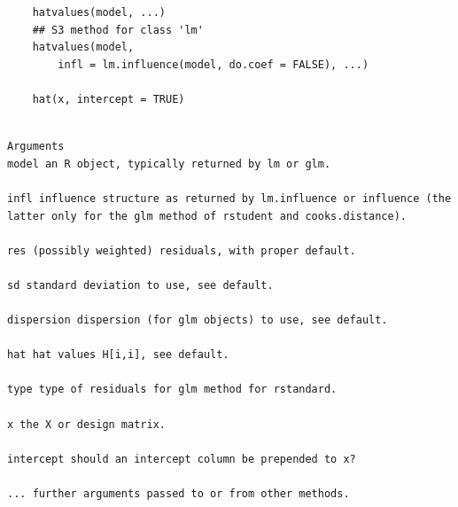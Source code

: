 \documentclass[residuals.tex]{subfiles}
\begin{document}
\begin{framed}
	\begin{verbatim}
	hatvalues(model, ...)
	## S3 method for class 'lm'
	hatvalues(model, 
		infl = lm.influence(model, do.coef = FALSE), ...)
	
	hat(x, intercept = TRUE)
	
	\end{verbatim}
\end{framed}
\newpage
\begin{verbatim}
Arguments
model an R object, typically returned by lm or glm.

infl influence structure as returned by lm.influence or influence (the latter only for the glm method of rstudent and cooks.distance).

res (possibly weighted) residuals, with proper default.

sd standard deviation to use, see default.

dispersion dispersion (for glm objects) to use, see default.

hat hat values H[i,i], see default.

type type of residuals for glm method for rstandard.

x the X or design matrix.

intercept should an intercept column be prepended to x?

... further arguments passed to or from other methods.

\end{verbatim}

\newpage
\end{document}
